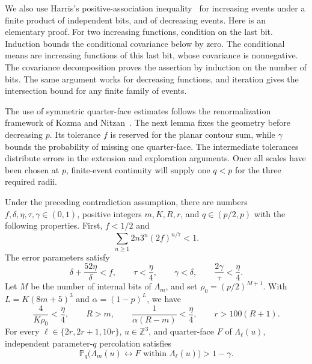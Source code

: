 We also use Harris's positive-association inequality~\cite{Harris1960}
for increasing events under a finite product
of independent bits, and of decreasing events. Here is an elementary proof.
For two increasing functions, condition on the last bit. Induction bounds the
conditional covariance below by zero. The conditional means are increasing
functions of this last bit, whose covariance is nonnegative. The covariance
decomposition proves the assertion by induction on the number of bits.
The same argument works for decreasing functions, and iteration gives the
intersection bound for any finite family of events.

The use of symmetric quarter-face estimates follows the renormalization
framework of Kozma and Nitzan~\cite[Section~4, Lemmas~8--9]{KozmaNitzan2024}.
The next lemma fixes the geometry before decreasing $p$. Its tolerance $f$
is reserved for the planar contour sum, while $\gamma$ bounds the probability
of missing one quarter-face. The intermediate tolerances distribute errors
in the extension and exploration arguments. Once all scales have been chosen
at $p$, finite-event continuity will supply one $q<p$ for the three required
radii.

\begin{lemma}\label{prelim:scales}
Under the preceding contradiction assumption, there are numbers
$f,\delta,\eta,\tau,\gamma\in(0,1)$, positive integers $m,K,R,r$, and
$q\in(p/2,p)$ with the following properties. First, $f<1/2$ and
\begin{equation}\label{prelim:contour-budget}
 \sum_{n\ge1}2n3^n(2f)^{n/7}<1.
\end{equation}
The error parameters satisfy
\begin{equation}\label{prelim:budgets}
 \delta+\frac{52\eta}{\delta}<f,\qquad
 \tau<\frac\eta4,\qquad \gamma<\delta,\qquad
 \frac{2\gamma}{\tau}<\frac\eta4.
\end{equation}
Let $M$ be the number of internal bits of $\Lambda_m$, and set
$\rho_0=(p/2)^{M+1}$. With $L=K(8m+5)^3$ and $\alpha=(1-p)^L$, we have
\begin{equation}\label{prelim:scale-inequalities}
 \frac4{K\rho_0}<\frac\eta4,\qquad
 R>m,\qquad \frac1{\alpha(R-m)}<\frac\eta4,\qquad r>100(R+1).
\end{equation}
For every $\ell\in\{2r,2r+1,10r\}$, $u\in\mathbb Z^3$, and quarter-face
$F$ of $\Lambda_\ell(u)$, independent parameter-$q$ percolation satisfies
\begin{equation}\label{prelim:quarterface}
 \mathbb P_q\bigl(\Lambda_m(u)\leftrightarrow F
              \text{ within }\Lambda_\ell(u)\bigr)>1-\gamma.
\end{equation}
\end{lemma}

